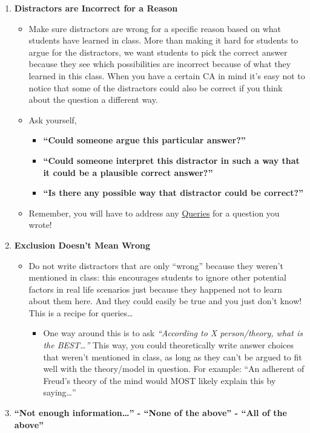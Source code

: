 \documentclass[
]{article}
\providecommand{\tightlist}{%
  \setlength{\itemsep}{0pt}\setlength{\parskip}{0pt}}
\begin{document}
\begin{enumerate}
\def\labelenumi{\arabic{enumi}.}
\tightlist
\item
  \textbf{Distractors are Incorrect for a Reason}

  \begin{itemize}
  \tightlist
  \item
    Make sure distractors are wrong for a specific reason based on what students have learned in class. More than making it hard for students to argue for the distractors, we want students to pick the correct answer because they see which possibilities are incorrect because of what they learned in this class. When you have a certain CA in mind it's easy not to notice that some of the distractors could also be correct if you think about the question a different way.
  \item
    Ask yourself,

    \begin{itemize}
    \tightlist
    \item
      \textbf{``Could someone argue this particular answer?''}
    \item
      \textbf{``Could someone interpret this distractor in such a way that it could be a plausible correct answer?''}
    \item
      \textbf{``Is there any possible way that distractor could be correct?''}\\
    \end{itemize}
  \item
    Remember, you will have to address any \protect\hyperlink{benchmark-queries}{Queries} for a question you wrote!
  \end{itemize}
\item
  \textbf{Exclusion Doesn't Mean Wrong}

  \begin{itemize}
  \tightlist
  \item
    Do not write distractors that are only ``wrong'' because they weren't mentioned in class: this encourages students to ignore other potential factors in real life scenarios just because they happened not to learn about them here. And they could easily be true and you just don't know! This is a recipe for queries\ldots{}

    \begin{itemize}
    \tightlist
    \item
      One way around this is to ask \emph{``According to X person/theory, what is the BEST\ldots{}''} This way, you could theoretically write answer choices that weren't mentioned in class, as long as they can't be argued to fit well with the theory/model in question. For example: ``An adherent of Freud's theory of the mind would MOST likely explain this by saying\ldots{}''
    \end{itemize}
  \end{itemize}
\item
  \textbf{``Not enough information\ldots{}'' - ``None of the above'' - ``All of the above''}


\end{enumerate}
\end{document}
